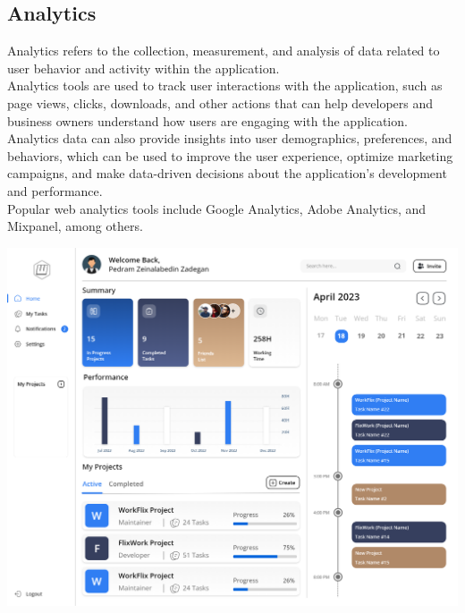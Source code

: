 \subsection{Analytics}
 Analytics refers to the collection, measurement, and analysis of data related to user behavior and activity within the application.\\
 
 Analytics tools are used to track user interactions with the application, such as page views, clicks, downloads, and other actions that can help developers and business owners understand how users are engaging with the application.\\
 
 Analytics data can also provide insights into user demographics, preferences, and behaviors, which can be used to improve the user experience, optimize marketing campaigns, and make data-driven decisions about the application's development and performance.\\
 
 Popular web analytics tools include Google Analytics, Adobe Analytics, and Mixpanel, among others.

\includegraphics[width=\columnwidth]{images/Analytics.png}

